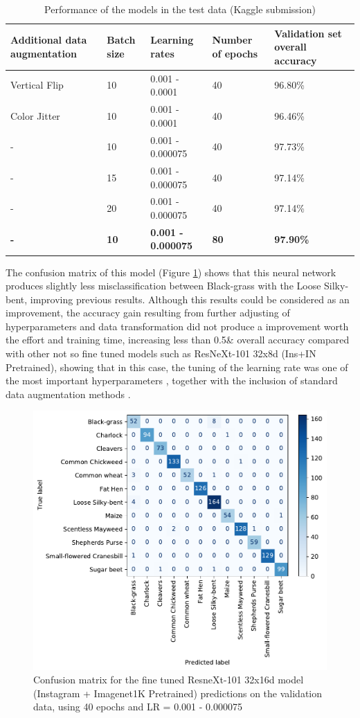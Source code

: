 \documentclass[11pt,onecolumn,titlepage,letterpaper]{article}
\begin{document}
\begin{table}[h]
	\begin{center}
		\begin{tabular}{|p{2.8cm}|p{2.8cm}|p{2.8cm}|p{2.8cm}|p{2.8cm}|}
			\hline
			Additional data augmentation & Batch size & Learning rates & Number of epochs & Validation set overall accuracy \\
			\hline\hline
			Vertical Flip & 10 & 0.001 - 0.0001 & 40 & 96.80\% \\
			Color Jitter & 10 & 0.001 - 0.0001 & 40 & 96.46\%  \\
			- & 10 & 0.001 - 0.000075 & 40 & 97.73\% \\
			- & 15 & 0.001 - 0.000075 & 40 & 97.14\%  \\
			- & 20 & 0.001 - 0.000075 & 40 & 97.14\%  \\
			\textbf{-} & \textbf{10} &\textbf{0.001 - 0.000075} & \textbf{80} & \textbf{97.90\%}  \\
			\hline
		\end{tabular}
	\end{center}
	\caption{Performance of the models in the test data (Kaggle submission)}
	\label{table:finetune}
\end{table}

The confusion matrix of this model (Figure \ref{fig:cm2}) shows that this neural network produces slightly less misclassification between Black-grass with the Loose Silky-bent, improving previous results. Although this results could be considered as an improvement, the accuracy gain resulting from further adjusting of hyperparameters and data transformation did not produce a improvement worth the effort and training time, increasing less than 0.5\& overall accuracy compared with other not so fine tuned models such as ResNeXt-101 32x8d (Ins+IN Pretrained), showing that in this case, the tuning of the learning rate was one of the most important hyperparameters \cite{Hastie2009}, together with the inclusion of standard data augmentation methods \cite{Shorten2019}.

\begin{figure}[h]
	\begin{center}
		\includegraphics[width=0.65\linewidth]{confusion_matrix_finetune.pdf}
	\end{center}
	\caption{Confusion matrix for the fine tuned ResneXt-101 32x16d model (Instagram + Imagenet1K Pretrained) predictions on the validation data, using 40 epochs and LR = 0.001 - 0.000075}
	\label{fig:cm2}
\end{figure}
\end{document}
